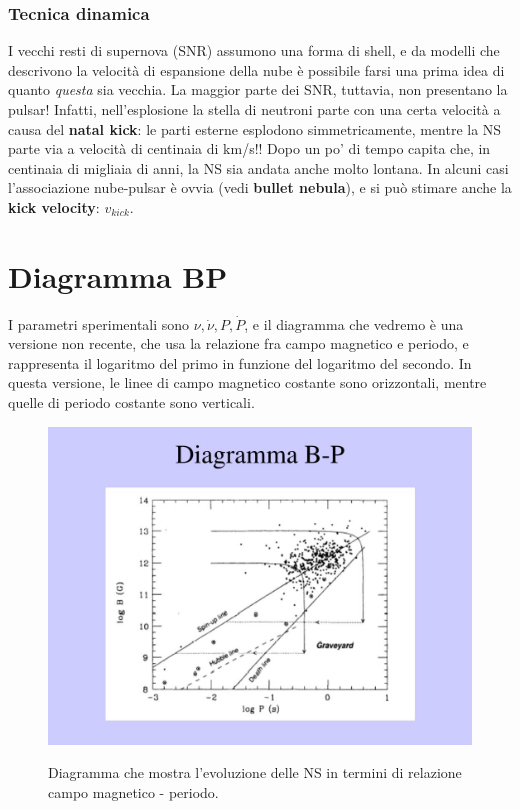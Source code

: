 \subsubsection{Tecnica dinamica}
I vecchi resti di supernova (SNR) assumono una forma di shell, e da modelli che descrivono la velocità di espansione della nube è possibile farsi una prima idea di quanto \textit{questa} sia vecchia.
La maggior parte dei SNR, tuttavia, non presentano la pulsar!
Infatti, nell'esplosione la stella di neutroni parte con una certa velocità a causa del \textbf{natal kick}: le parti esterne esplodono simmetricamente, mentre la NS parte via a velocità di centinaia di km/s!!
Dopo un po' di tempo capita che, in centinaia di migliaia di anni, la NS sia andata anche molto lontana.
In alcuni casi l'associazione nube-pulsar è ovvia (vedi \textbf{bullet nebula}), e si può stimare anche la \textbf{kick velocity}: $v_{kick}$.

\section{Diagramma BP}
I parametri sperimentali sono $\nu,\dot{\nu},P,\dot{P}$, e il diagramma che vedremo è una versione non recente, che usa la relazione fra campo magnetico e periodo, e rappresenta il logaritmo del primo in funzione del logaritmo del secondo.
In questa versione, le linee di campo magnetico costante sono orizzontali, mentre quelle di periodo costante sono verticali.
\begin{figure}[h!]
    \centering
    \includegraphics[width=0.7\linewidth]{Immagini/diagramma-b-p-l.jpg}
    \label{fig: diagramma BP}
    \caption{Diagramma che mostra l'evoluzione delle NS in termini di relazione campo magnetico - periodo.}
\end{figure}

